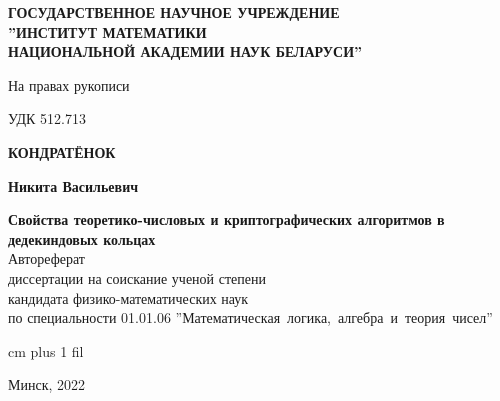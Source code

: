 \documentclass[_00_autoref.tex]{subfiles}
\begin{document}
\thispagestyle{empty}
\normalsize
\begin{center}
{\fontsize{16}{16}\selectfont \textbf{ГОСУДАРСТВЕННОЕ НАУЧНОЕ УЧРЕЖДЕНИЕ\\''ИНСТИТУТ МАТЕМАТИКИ\\НАЦИОНАЛЬНОЙ АКАДЕМИИ НАУК БЕЛАРУСИ''}}
\end{center}
\vspace{6ex}
\normalsize

\noindent На правах рукописи\par
\noindent УДК 512.713

\normalsize
\begin{center}
\vspace{14ex}
{\fontsize{16}{16}\selectfont \textbf{КОНДРАТЁНОК}}

{\fontsize{16}{16}\selectfont \textbf{Никита Васильевич}}
\end{center}
\vspace{0ex}
\begin{center}
\large
\textbf{Свойства теоретико-числовых и криптографических алгоритмов в дедекиндовых кольцах}\\
\vspace{4ex}
{\fontsize{15}{15}\selectfont Автореферат}\\
{\fontsize{15}{15}\selectfont диссертации на соискание ученой степени}\\
{\fontsize{15}{15}\selectfont кандидата физико-математических наук}\\
\vspace{2ex}
{\fontsize{15}{15}\selectfont по специальности 01.01.06 ''Математическая~логика,~алгебра~и~теория~чисел''}
\vspace{2ex}
\end{center}

 cm plus 1 fil
\begin{center}
Минск, 2022
\end{center}
\eject
\end{document}
